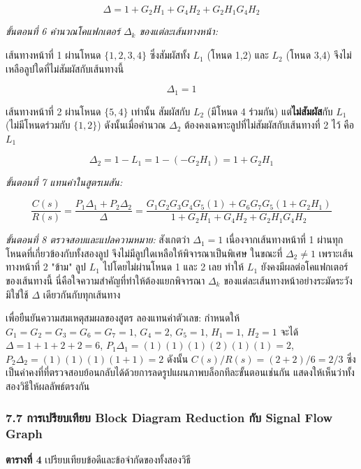 \[
\Delta = 1 + G_2H_1 + G_4H_2 + G_2H_1G_4H_2
\]

\textit{ขั้นตอนที่ 6 คำนวณโคแฟกเตอร์ $\Delta_k$ ของแต่ละเส้นทางหน้า:}

เส้นทางหน้าที่ 1 ผ่านโหนด $\{1,2,3,4\}$ ซึ่งสัมผัสทั้ง $L_1$ (โหนด 1,2) และ $L_2$ (โหนด 3,4) จึงไม่เหลือลูปใดที่ไม่สัมผัสกับเส้นทางนี้

\[
\Delta_1 = 1
\]

เส้นทางหน้าที่ 2 ผ่านโหนด $\{5,4\}$ เท่านั้น สัมผัสกับ $L_2$ (มีโหนด 4 ร่วมกัน) แต่\textbf{ไม่สัมผัส}กับ $L_1$ (ไม่มีโหนดร่วมกับ $\{1,2\}$) ดังนั้นเมื่อคำนวณ $\Delta_2$ ต้องคงเฉพาะลูปที่ไม่สัมผัสกับเส้นทางที่ 2 ไว้ คือ $L_1$

\[
\Delta_2 = 1 - L_1 = 1-(-G_2H_1) = 1+G_2H_1
\]

\textit{ขั้นตอนที่ 7 แทนค่าในสูตรเมสัน:}

\[
\frac{C(s)}{R(s)} = \frac{P_1\Delta_1 + P_2\Delta_2}{\Delta} = \frac{G_1G_2G_3G_4G_5(1) + G_6G_7G_5(1+G_2H_1)}{1+G_2H_1+G_4H_2+G_2H_1G_4H_2}
\]

\textit{ขั้นตอนที่ 8 ตรวจสอบและแปลความหมาย:} สังเกตว่า $\Delta_1 = 1$ เนื่องจากเส้นทางหน้าที่ 1 ผ่านทุกโหนดที่เกี่ยวข้องกับทั้งสองลูป จึงไม่มีลูปใดเหลือให้พิจารณาเป็นพิเศษ ในขณะที่ $\Delta_2 \neq 1$ เพราะเส้นทางหน้าที่ 2 "ข้าม" ลูป $L_1$ ไปโดยไม่ผ่านโหนด 1 และ 2 เลย ทำให้ $L_1$ ยังคงมีผลต่อโคแฟกเตอร์ของเส้นทางนี้ นี่คือใจความสำคัญที่ทำให้ต้องแยกพิจารณา $\Delta_k$ ของแต่ละเส้นทางหน้าอย่างระมัดระวัง มิใช่ใช้ $\Delta$ เดียวกันกับทุกเส้นทาง

เพื่อยืนยันความสมเหตุสมผลของสูตร ลองแทนค่าตัวเลข: กำหนดให้ $G_1=G_2=G_3=G_6=G_7=1$, $G_4=2$, $G_5=1$, $H_1=1$, $H_2=1$ จะได้ $\Delta = 1+1+2+2 = 6$, $P_1\Delta_1 = (1)(1)(1)(2)(1)(1)=2$, $P_2\Delta_2 = (1)(1)(1)(1+1) = 2$ ดังนั้น $C(s)/R(s) = (2+2)/6 = 2/3$ ซึ่งเป็นค่าคงที่ที่ตรวจสอบย้อนกลับได้ด้วยการลดรูปแผนภาพบล็อกทีละขั้นตอนเช่นกัน แสดงให้เห็นว่าทั้งสองวิธีให้ผลลัพธ์ตรงกัน

\subsubsection{7.7 การเปรียบเทียบ Block Diagram Reduction กับ Signal Flow Graph}

\textbf{ตารางที่ 4} เปรียบเทียบข้อดีและข้อจำกัดของทั้งสองวิธี

